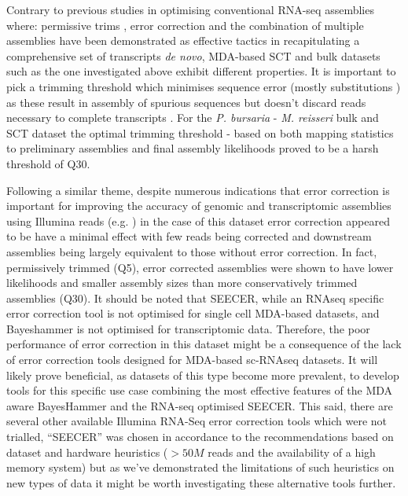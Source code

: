 Contrary to previous studies in optimising conventional RNA-seq assemblies where:
permissive trims \citep{Macmanes2014}, error correction \citep{Macmanes2013,Macmanes2015} and the combination of multiple assemblies
\citep{Nakasugi2014} have been demonstrated as effective tactics in recapitulating a comprehensive
set of transcripts \textit{de novo}, MDA-based SCT and bulk datasets such as the one investigated
above exhibit different properties.  
It is important to pick a trimming threshold which minimises sequence error (mostly substitutions \citep{Yang2013}) as these
result in assembly of spurious sequences but doesn't discard reads necessary to complete transcripts \citep{Macmanes2013,Macmanes2014}. 
For the \textit{P. bursaria} - \textit{M. reisseri} bulk and SCT dataset the optimal trimming threshold - based on both
mapping statistics to preliminary assemblies and final assembly likelihoods proved to be a harsh threshold of Q30. 

Following a similar theme, despite numerous indications that error correction is important for improving the accuracy
of genomic and transcriptomic assemblies using Illumina reads (e.g. \citep{Molnar2014,Macmanes2015}) 
in the case of this dataset error correction appeared to be have a minimal effect with few
reads being corrected and downstream assemblies being largely equivalent to those
without error correction.  In fact, permissively trimmed (Q5), error corrected assemblies 
were shown to have lower likelihoods and smaller assembly sizes
than more conservatively trimmed assemblies (Q30).
It should be noted that SEECER, while an RNAseq specific error correction tool is not
optimised for single cell MDA-based datasets, and Bayeshammer is not optimised
for transcriptomic data.  Therefore, the poor performance of error correction
in this dataset might be a consequence of the lack of error correction tools
designed for MDA-based sc-RNAseq datasets. It will likely prove beneficial, as 
datasets of this type become more prevalent, to develop tools for this specific
use case combining the most effective features of the MDA aware BayesHammer 
and the RNA-seq optimised SEECER.  This said, there are several other available 
Illumina RNA-Seq error correction tools 
which were not trialled, ``SEECER'' was chosen in accordance to the recommendations based on dataset and hardware
heuristics (\(>50M\) reads and the availability of a high memory system) \citep{Macmanes2015} but
as we've demonstrated the limitations of such heuristics on new types of data it might 
be worth investigating these alternative tools further.

